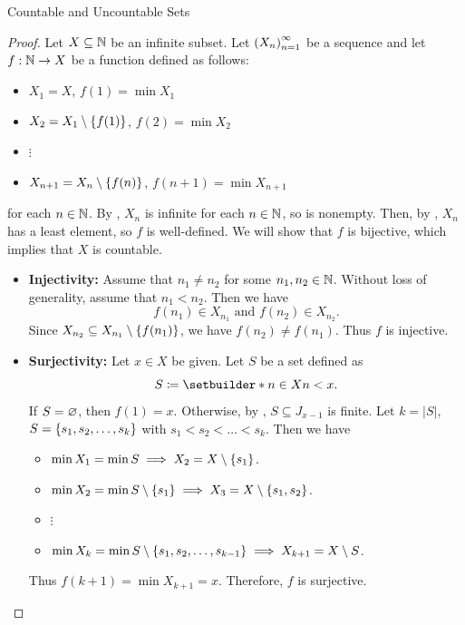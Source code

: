 \begin{section}{Countable and Uncountable Sets}
\begin{proof}
    Let $X \subseteq \N$ be an infinite subset. Let $\paren*{X_{n}}_{n = 1}^{\infty}$ be a sequence
    and let $f: \N \to X$ be a function defined as follows:
    \begin{itemize}
        \item $X_{1} = X$, $f(1) = \min X_{1}$
        \item $X_{2} = X_{1} \setminus \set*{f(1)}$, $f(2) = \min X_{2}$
        \item[] $\vdots$
        \item $X_{n + 1} = X_{n} \setminus \set*{f(n)}$, $f(n + 1) = \min X_{n + 1}$
    \end{itemize}
    for each $n \in \N$. By , $X_{n}$ is infinite for each $n \in \N$,
    so is nonempty. Then, by , $X_{n}$ has a least element, so $f$ is well-defined.
    We will show that $f$ is bijective, which implies that $X$ is countable.
    \begin{itemize}
        \item \textbf{Injectivity:} Assume that $n_{1} \neq n_{2}$ for some $n_{1}, n_{2} \in \N$.
        Without loss of generality, assume that $n_{1} < n_{2}$. Then we have
        \[
        f(n_{1}) \in X_{n_{1}} \text{ and } f(n_{2}) \in X_{n_{2}}.
        \]
        Since $X_{n_{2}} \subseteq X_{n_{1}} \setminus \set*{f(n_{1})}$,
        we have $f(n_{2}) \neq f(n_{1})$. Thus $f$ is injective.
        \item \textbf{Surjectivity:} Let $x \in X$ be given. Let $S$ be a set defined as
        \[
        S \coloneqq \setbuilder*{n \in X}{n < x}.
        \]
        If $S = \vnot$, then $f(1) = x$. Otherwise, by , $S \subseteq J_{x - 1}$ is finite.
        Let $k = |S|$, $S = \set*{s_{1}, s_{2}, \dots, s_{k}}$ with $s_{1} < s_{2} < \dots < s_{k}$. Then we have
        \begin{itemize}
            \item $\min X_{1} = \min S \implies X_{2} = X \setminus \set*{s_{1}}$.
            \item $\min X_{2} = \min S \setminus \set*{s_{1}} \implies X_{3} = X \setminus \set*{s_{1}, s_{2}}$.
            \item[] $\vdots$
            \item $\min X_{k} = \min S \setminus \set*{s_{1}, s_{2}, \dots, s_{k - 1}} \implies X_{k + 1} = X \setminus S$.
        \end{itemize}
        Thus $f(k + 1) = \min X_{k + 1} = x$. Therefore, $f$ is surjective.
    \end{itemize}
\end{proof}


\end{section}
